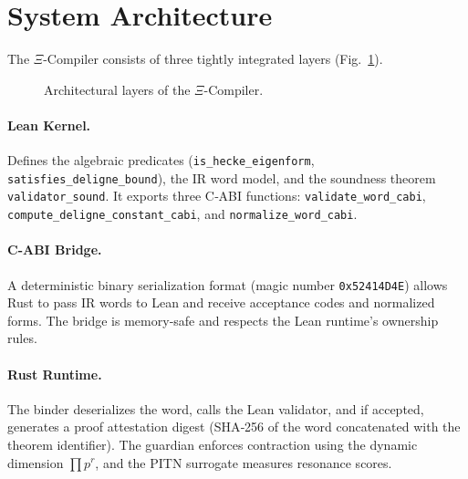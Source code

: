 \documentclass[11pt,a4paper]{article}
\begin{document}
\section{System Architecture}
The $\Xi$-Compiler consists of three tightly integrated layers (Fig.~\ref{fig:arch}).

\begin{figure}[H]
\centering
{}
\caption{Architectural layers of the $\Xi$-Compiler.}
\label{fig:arch}
\end{figure}

\paragraph{Lean Kernel.} Defines the algebraic predicates (\texttt{is\_hecke\_eigenform}, \texttt{satisfies\_deligne\_bound}), the IR word model, and the soundness theorem \texttt{validator\_sound}. It exports three C‑ABI functions: \texttt{validate\_word\_cabi}, \texttt{compute\_deligne\_constant\_cabi}, and \texttt{normalize\_word\_cabi}.

\paragraph{C-ABI Bridge.} A deterministic binary serialization format (magic number \texttt{0x52414D4E}) allows Rust to pass IR words to Lean and receive acceptance codes and normalized forms. The bridge is memory‑safe and respects the Lean runtime's ownership rules.

\paragraph{Rust Runtime.} The binder deserializes the word, calls the Lean validator, and if accepted, generates a proof attestation digest (SHA‑256 of the word concatenated with the theorem identifier). The guardian enforces contraction using the dynamic dimension $\prod p^r$, and the PITN surrogate measures resonance scores.
\end{document}
